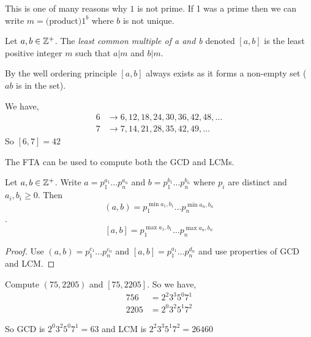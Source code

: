 \begin{remark}
    This is one of many reasons why $1$ is not prime. If 1 was a prime then we can write  $m = \text{(product)} 1^{b}$ where $b$ is not unique.
\end{remark}

\begin{definition}[LCM]
    Let $a, b \in \mathbb{Z}^{+}$. The \emph{least common multiple of a and b} denoted $[a,b]$ is the least positive integer  $m$ such that $a | m$ and  $b | m$.
\end{definition}

\begin{remark}
    By the well ordering principle $[a,b]$ always exists as it forms a non-empty set ($ab$ is in the set).
\end{remark}

\begin{eg}
    We have, 
    \begin{align*}
        6 &\rightarrow 6,12,18,24,30,36,42,48, \dots \\
        7 &\rightarrow 7, 14, 21, 28, 35, 42, 49, \dots
    \end{align*}
    So $[6,7] = 42$
\end{eg}

\begin{remark}
    The FTA can be used to compute both the GCD and LCMs.
\end{remark}

\begin{prop}
    Let $a,b \in \mathbb{Z}^{+}$. Write $a = p_1^{a_1}\dots p_n^{a_n}$ and $b = p_1^{b_1} \dots p_n^{b_n}$ where $p_i$ are distinct and  $a_i, b_i \ge 0$. Then 
    $$(a, b) = p_1^{\min{a_1, b_1}} \dots p_n^{\min{a_n, b_n}}$$.  
    $$[a, b] = p_1^{\max{a_1, b_1}} \dots p_n^{\max{a_n, b_n}}$$
\end{prop}

\begin{proof}
    Use $(a, b) = p_1^{c_1} \dots p_n^{c_n}$ and $[a,b] = p_1^{a_1} \dots p_n^{d_n}$ and use properties of GCD and LCM.
\end{proof}

\begin{eg}
    Compute $(75, 2205)$ and $[75, 2205]$. So we have, 
     \begin{align*}
         756 &= 2^{2}3^{3}5^{0}7^{1}\\
         2205 &= 2^{0}3^{2}5^{1}7^{2}
    \end{align*}

    So GCD is  $2^{0}3^{2}5^{0}7^{1} = 63$ and LCM is  $2^{2}3^{3}5^{1}7^{2} = 26460$
\end{eg}

